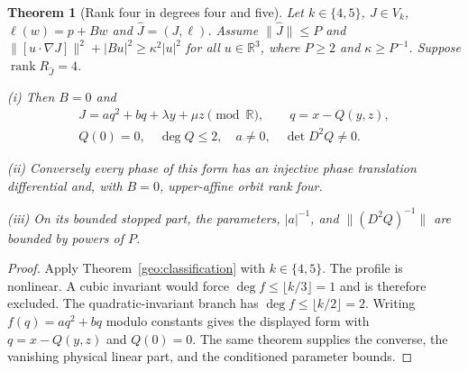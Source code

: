 \documentclass[11pt]{amsart}
\newtheorem{theorem}{Theorem}[section]
\theoremstyle{definition}
\theoremstyle{remark}
\numberwithin{equation}{section}
\begin{document}
\begin{theorem}[Rank four in degrees four and five]\label{geo:rank-four-low}
Let $k\in\{4,5\}$, $J\in V_k$, $\ell(w)=p+Bw$ and $\widehat J=(J,\ell)$. Assume $\|\widehat J\|\le P$ and $\|[u\cdot\nabla J]\|^2+|Bu|^2\ge\kappa^2|u|^2$ for all $u\in\mathbb R^3$, where $P\ge2$ and $\kappa\ge P^{-1}$. Suppose $\operatorname{rank}R_{\widehat J}=4$.

\noindent\textup{(i)} Then $B=0$ and
\begin{equation}\label{low:4:rc:rankfour-form}
\begin{gathered}
J=a q^2+bq+\lambda y+\mu z\pmod{\mathbb R},\qquad q=x-Q(y,z),\\
Q(0)=0,\quad\deg Q\le2,\quad a\ne0,\quad\det D^2Q\ne0.
\end{gathered}
\end{equation}

\noindent\textup{(ii)} Conversely every phase of this form has an injective phase translation differential and, with $B=0$, upper-affine orbit rank four.

\noindent\textup{(iii)} On its bounded stopped part, the parameters, $|a|^{-1}$, and $\|(D^2Q)^{-1}\|$ are bounded by powers of $P$.
\end{theorem}
\begin{proof}
Apply Theorem~\ref{geo:classification} with $k\in\{4,5\}$. The profile is nonlinear. A cubic invariant would force $\deg f\le\lfloor k/3\rfloor=1$ and is therefore excluded. The quadratic-invariant branch has $\deg f\le\lfloor k/2\rfloor=2$. Writing $f(q)=aq^2+bq$ modulo constants gives the displayed form with $q=x-Q(y,z)$ and $Q(0)=0$. The same theorem supplies the converse, the vanishing physical linear part, and the conditioned parameter bounds.
\end{proof}
\end{document}
